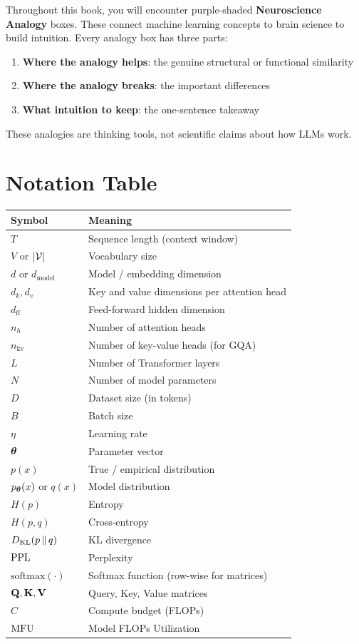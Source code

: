 Throughout this book, you will encounter purple-shaded \textbf{Neuroscience Analogy} boxes. These connect machine learning concepts to brain science to build intuition. Every analogy box has three parts:
\begin{enumerate}
  \item \textbf{Where the analogy helps}: the genuine structural or functional similarity
  \item \textbf{Where the analogy breaks}: the important differences
  \item \textbf{What intuition to keep}: the one-sentence takeaway
\end{enumerate}

These analogies are thinking tools, not scientific claims about how LLMs work.

\section{Notation Table}
\label{ch:00:sec:notation_table}

\begin{longtable}{lp{10cm}}
\toprule
\textbf{Symbol} & \textbf{Meaning} \\
\midrule
$T$ & Sequence length (context window) \\
$V$ or $|\mathcal{V}|$ & Vocabulary size \\
$d$ or $d_{\text{model}}$ & Model / embedding dimension \\
$d_k, d_v$ & Key and value dimensions per attention head \\
$d_{\text{ff}}$ & Feed-forward hidden dimension \\
$n_h$ & Number of attention heads \\
$n_{\text{kv}}$ & Number of key-value heads (for GQA) \\
$L$ & Number of Transformer layers \\
$N$ & Number of model parameters \\
$D$ & Dataset size (in tokens) \\
$B$ & Batch size \\
$\eta$ & Learning rate \\
$\boldsymbol{\theta}$ & Parameter vector \\
$p(x)$ & True / empirical distribution \\
$p_{\boldsymbol{\theta}}(x)$ or $q(x)$ & Model distribution \\
$H(p)$ & Entropy \\
$H(p, q)$ & Cross-entropy \\
$D_{\mathrm{KL}}\!\left(p \,\|\, q\right)$ & KL divergence \\
$\operatorname{PPL}$ & Perplexity \\
$\text{softmax}(\cdot)$ & Softmax function (row-wise for matrices) \\
$\mathbf{Q}, \mathbf{K}, \mathbf{V}$ & Query, Key, Value matrices \\
$C$ & Compute budget (FLOPs) \\
$\operatorname{MFU}$ & Model FLOPs Utilization \\
\bottomrule
\end{longtable}

